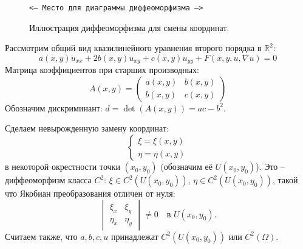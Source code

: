 \documentclass[12pt, a4paper]{article}
\begin{document}
\begin{figure}[h!]
    \centering
    \texttt{<--- Место для диаграммы диффеоморфизма --->}
    \caption{Иллюстрация диффеоморфизма для смены координат.}
    \label{fig:diffeomorphism}
\end{figure}

Рассмотрим общий вид квазилинейного уравнения второго порядка в $\mathbb{R}^2$:
\begin{equation} \label{eq:quasilinear}
    a(x,y) u_{xx} + 2b(x,y) u_{xy} + c(x,y) u_{yy} + F(x, y, u, \nabla u) = 0 \tag{$*$}
\end{equation}
Матрица коэффициентов при старших производных:
\[
    A(x,y) = \begin{pmatrix} a(x,y) & b(x,y) \\ b(x,y) & c(x,y) \end{pmatrix}
\]
Обозначим дискриминант: $d = \det(A(x,y)) = ac - b^2$.

Сделаем невырожденную замену координат:
\[
    \begin{cases}
        \xi = \xi(x,y) \\
        \eta = \eta(x,y)
    \end{cases}
\]
в некоторой окрестности точки $(x_0, y_0)$ (обозначим её $U(x_0, y_0)$).
Это -- диффеоморфизм класса $C^2$: $\xi \in C^2(U(x_0, y_0))$, $\eta \in C^2(U(x_0, y_0))$, такой что Якобиан преобразования отличен от нуля:
\[
    \begin{vmatrix} \xi_x & \xi_y \\ \eta_x & \eta_y \end{vmatrix} \neq 0 \quad \text{в } U(x_0, y_0).
\]
Считаем также, что $a, b, c, u$ принадлежат $C^2(U(x_0, y_0))$ или $C^2(\Omega)$.
\end{document}
